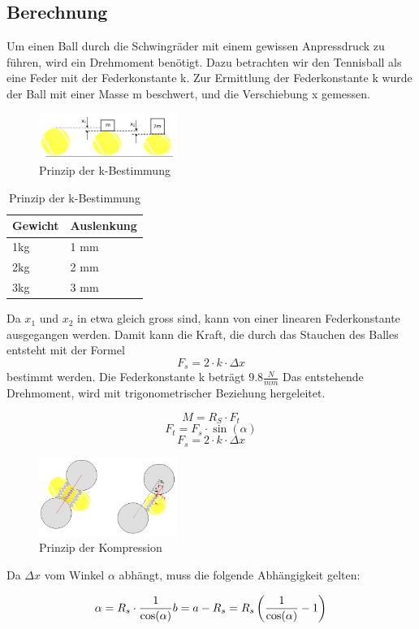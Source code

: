 \subsection{Berechnung}
Um einen Ball durch die Schwingräder mit einem gewissen Anpressdruck zu führen, wird ein Drehmoment benötigt. Dazu betrachten wir den Tennisball als eine Feder mit der Federkonstante k.
Zur Ermittlung der Federkonstante k wurde der Ball mit einer Masse m beschwert, und die Verschiebung x gemessen.

\begin{figure}[h!]
	\centering
	\includegraphics[width=0.4\textwidth]{Enddokumentation/Anhang/Bilder/KompressionBaelle.png}
	\caption{Prinzip der k-Bestimmung}
	\label{fig:BallKomp}
\end{figure}

\begin{table}[h!]
	\begin{tabular}{p{1.5cm}p{2cm}}
		Gewicht & Auslenkung\\
		\hline
		1kg & 1 mm\\
		2kg & 2 mm\\
		3kg & 3 mm\\
	\end{tabular}
	\centering
	\caption{Prinzip der k-Bestimmung}
	\label{tab:BallKompErgebnis}
\end{table}
Da $x_1$ und $x_2$ in etwa gleich gross sind, kann von einer linearen Federkonstante ausgegangen werden. Damit kann die Kraft, die durch das Stauchen des Balles entsteht mit der Formel
\begin{equation}  
 F_s=2\cdot k \cdot \Delta x 
 \end{equation}
bestimmt werden. Die Federkonstante k beträgt $9.8\frac{N}{mm}$ Das entstehende Drehmoment, wird mit trigonometrischer Beziehung hergeleitet. 

\begin{equation}  
 	M = R_S \cdot F_t
 \end{equation}
\begin{equation}  
	F_t = F_s \cdot \sin(\alpha)
\end{equation}
\begin{equation}  
	F_s = 2\cdot k \cdot \Delta x 
\end{equation}
\begin{figure}[h!]
	\centering
	\includegraphics[width=0.4\textwidth]{Enddokumentation/Anhang/Bilder/PrinzipKompression.png}
	\caption{Prinzip der Kompression}
	\label{fig:PrinzipBallKomp}
\end{figure}
Da $\Delta x$ vom Winkel $\alpha$ abhängt, muss die folgende Abhängigkeit gelten:

\begin{equation}  
	\alpha = R_s \cdot \frac{1}{\cos(\alpha)} \\ b = a - R_s = R_s \left( \frac{1}{\cos(\alpha)}-1\right)   
\end{equation}